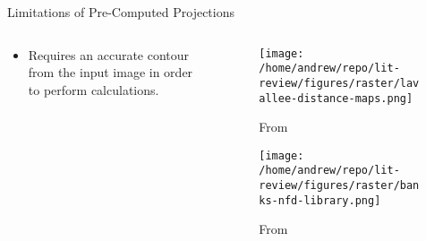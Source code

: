\documentclass[presentation, aspectratio=1610]{beamer}
\begin{document}
\begin{frame}[label={sec:orgc52ff3d}]{Limitations of Pre-Computed Projections}
\begin{columns}
\begin{column}{0.5\columnwidth}
\begin{itemize}
\item Requires an accurate contour from the input image in order to perform calculations.
\end{itemize}
\end{column}
\begin{column}{0.6\columnwidth}
\begin{figure}[htbp]
\centering
\texttt{[image: /home/andrew/repo/lit-review/figures/raster/lavallee-distance-maps.png]}
\caption{From \autocite{lavalleeRecoveringPositionOrientation1995}}
\end{figure}
\vspace{-0.25in}
\begin{figure}[htbp]
\centering
\texttt{[image: /home/andrew/repo/lit-review/figures/raster/banks-nfd-library.png]}
\caption{From \autocite{banksAccurateMeasurementThreedimensional1996}}
\end{figure}
\end{column}
\end{columns}
\end{frame}
\end{document}
